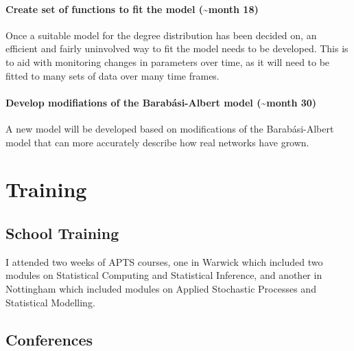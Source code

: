 \documentclass[
  10pt,
  a4paper,
]{scrreprt}
\theoremstyle{definition}
\theoremstyle{plain}
\theoremstyle{plain}
\theoremstyle{remark}
\begin{document}
{\hypertarget{create-set-of-functions-to-fit-the-model-month-18}{%
\subsubsection*{Create set of functions to fit the model
(\textasciitilde month
18)}\label{create-set-of-functions-to-fit-the-model-month-18}}

Once a suitable model for the degree distribution has been decided on,
an efficient and fairly uninvolved way to fit the model needs to be
developed. This is to aid with monitoring changes in parameters over
time, as it will need to be fitted to many sets of data over many time
frames.

\hypertarget{develop-modifiations-of-the-barabuxe1si-albert-model-month-30}{%
\subsubsection*{Develop modifiations of the Barabási-Albert model
(\textasciitilde month
30)}\label{develop-modifiations-of-the-barabuxe1si-albert-model-month-30}}

A new model will be developed based on modifications of the
Barabási-Albert model that can more accurately describe how real
networks have grown.

\hypertarget{training}{%
\chapter{Training}\label{training}}

\hypertarget{school-training}{%
\section{School Training}\label{school-training}}

I attended two weeks of APTS courses, one in Warwick which included two
modules on Statistical Computing and Statistical Inference, and another
in Nottingham which included modules on Applied Stochastic Processes and
Statistical Modelling.

\hypertarget{conferences}{%
\section{Conferences}\label{conferences}}

}
\end{document}
